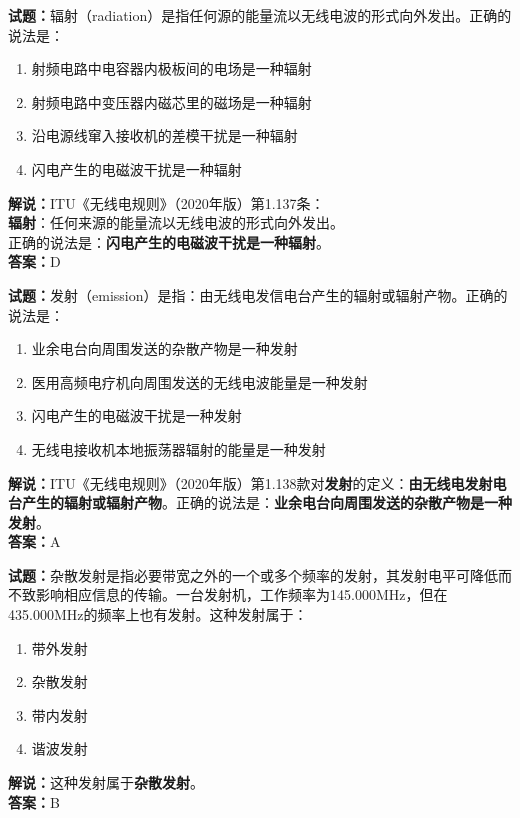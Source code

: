 \documentclass{ctexbook}
\begin{document}
\bigskip

\noindent\textbf{试题：}辐射（radiation）是指任何源的能量流以无线电波的形式向外发出。正确的说法是：
\begin{enumerate}[leftmargin=3em]
  \item 射频电路中电容器内极板间的电场是一种辐射
  \item 射频电路中变压器内磁芯里的磁场是一种辐射
  \item 沿电源线窜入接收机的差模干扰是一种辐射
  \item 闪电产生的电磁波干扰是一种辐射
\end{enumerate}
\textbf{解说：}ITU《无线电规则》（2020年版）第1.137条：\\\textbf{辐射}：任何来源的能量流以无线电波的形式向外发出。\\正确的说法是：\textbf{闪电产生的电磁波干扰是一种辐射}。\\\noindent\textbf{答案：}D

\bigskip

\noindent\textbf{试题：}发射（emission）是指：由无线电发信电台产生的辐射或辐射产物。正确的说法是：
\begin{enumerate}[leftmargin=3em]
  \item 业余电台向周围发送的杂散产物是一种发射
  \item 医用高频电疗机向周围发送的无线电波能量是一种发射
  \item 闪电产生的电磁波干扰是一种发射
  \item 无线电接收机本地振荡器辐射的能量是一种发射
\end{enumerate}
\noindent\textbf{解说：}ITU《无线电规则》（2020年版）第1.138款对\textbf{发射}的定义：\textbf{由无线电发射电台产生的辐射或辐射产物}。正确的说法是：\textbf{业余电台向周围发送的杂散产物是一种发射}。\\\noindent\textbf{答案：}A

\bigskip

\noindent\textbf{试题：}杂散发射是指必要带宽之外的一个或多个频率的发射，其发射电平可降低而不致影响相应信息的传输。一台发射机，工作频率为145.000\unit{\MHz}，但在435.000\unit{\MHz}的频率上也有发射。这种发射属于：
\begin{enumerate}[leftmargin=3em]
  \item 带外发射
  \item 杂散发射
  \item 带内发射
  \item 谐波发射
\end{enumerate}
\noindent\textbf{解说：}这种发射属于\textbf{杂散发射}。\\\noindent\textbf{答案：}B
\end{document}
